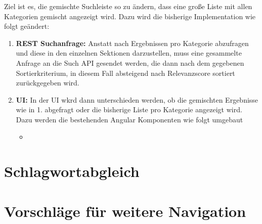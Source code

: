 Ziel ist es, die gemischte Suchleiste so zu ändern, dass eine große Liste mit allen Kategorien gemischt angezeigt wird.
Dazu wird die bisherige Implementation wie folgt geändert:
\begin{enumerate}
  \item \textbf{REST Suchanfrage:} Anstatt nach Ergebnissen pro Kategorie abzufragen und diese in den einzelnen Sektionen darzustellen, muss eine gesammelte Anfrage an die Such API gesendet werden, die dann nach dem gegebenen Sortierkriterium, in diesem Fall absteigend nach Relevanzscore sortiert zurückgegeben wird. %
  \item \textbf{UI:} In der UI wkrd dann unterschieden werden, ob die gemischten Ergebnisse wie in 1. abgefragt oder die bisherige Liste pro Kategorie angezeigt wird. Dazu werden die bestehenden Angular Komponenten wie folgt umgebaut
  \begin{itemize}
    \item   %
  \end{itemize}
\end{enumerate}



\section{Schlagwortabgleich}
\label{sec:devKeywords}



\section{Vorschläge für weitere Navigation}
\label{sec:devSuggestions}

